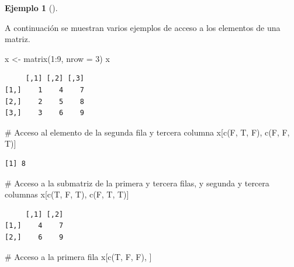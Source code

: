 \documentclass[
  a4paper,
]{scrreport}
\newenvironment{Shaded}{\begin{snugshade}}{\end{snugshade}}
\newcommand{\AttributeTok}[1]{\textcolor[rgb]{0.40,0.45,0.13}{#1}}
\newcommand{\CommentTok}[1]{\textcolor[rgb]{0.37,0.37,0.37}{#1}}
\newcommand{\DecValTok}[1]{\textcolor[rgb]{0.68,0.00,0.00}{#1}}
\newcommand{\FunctionTok}[1]{\textcolor[rgb]{0.28,0.35,0.67}{#1}}
\newcommand{\NormalTok}[1]{\textcolor[rgb]{0.00,0.23,0.31}{#1}}
\newcommand{\OtherTok}[1]{\textcolor[rgb]{0.00,0.23,0.31}{#1}}
\newcommand{\SpecialCharTok}[1]{\textcolor[rgb]{0.37,0.37,0.37}{#1}}
\theoremstyle{definition}
\newtheorem{example}{Ejemplo}[chapter]
\theoremstyle{definition}
\theoremstyle{remark}
\begin{document}
\leavevmode{}%
\begin{example}[]\label{exm-acceso-matriz-logico}

A continuación se muestran varios ejemplos de acceso a los elementos de
una matriz.

\begin{Shaded}
\begin{Highlighting}[]
\NormalTok{x }\OtherTok{\textless{}{-}} \FunctionTok{matrix}\NormalTok{(}\DecValTok{1}\SpecialCharTok{:}\DecValTok{9}\NormalTok{, }\AttributeTok{nrow =} \DecValTok{3}\NormalTok{)}
\NormalTok{x}
\end{Highlighting}
\end{Shaded}

\begin{verbatim}
     [,1] [,2] [,3]
[1,]    1    4    7
[2,]    2    5    8
[3,]    3    6    9
\end{verbatim}

\begin{Shaded}
\begin{Highlighting}[]
\CommentTok{\# Acceso al elemento de la segunda fila y tercera columna}
\NormalTok{x[}\FunctionTok{c}\NormalTok{(F, T, F), }\FunctionTok{c}\NormalTok{(F, F, T)]}
\end{Highlighting}
\end{Shaded}

\begin{verbatim}
[1] 8
\end{verbatim}

\begin{Shaded}
\begin{Highlighting}[]
\CommentTok{\# Acceso a la submatriz de la primera y tercera filas, y segunda y tercera columnas}
\NormalTok{x[}\FunctionTok{c}\NormalTok{(T, F, T), }\FunctionTok{c}\NormalTok{(F, T, T)]}
\end{Highlighting}
\end{Shaded}

\begin{verbatim}
     [,1] [,2]
[1,]    4    7
[2,]    6    9
\end{verbatim}

\begin{Shaded}
\begin{Highlighting}[]
\CommentTok{\# Acceso a la primera fila}
\NormalTok{x[}\FunctionTok{c}\NormalTok{(T, F, F), ]}
\end{Highlighting}
\end{Shaded}


\end{example}
\end{document}
